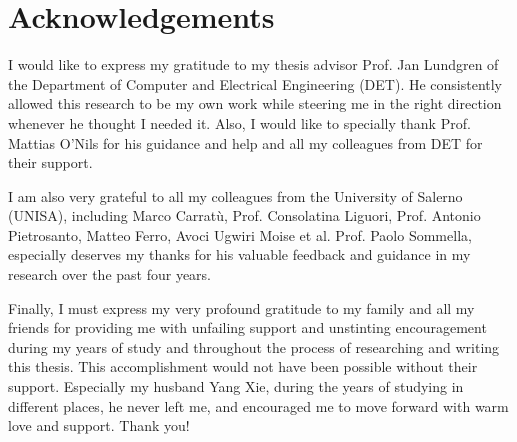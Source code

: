 \thispagestyle{plain}

\chapter*{Acknowledgements} 

I would like to express my gratitude to my thesis advisor Prof. Jan Lundgren of the Department of Computer and Electrical Engineering (DET). He consistently allowed this research to be my own work while steering me in the right direction whenever he thought I needed it. Also, I would like to specially thank Prof. Mattias O’Nils for his guidance and help and all my colleagues from DET for their support.

I am also very grateful to all my colleagues from the University of Salerno (UNISA), including Marco Carratù, Prof. Consolatina Liguori, Prof. Antonio Pietrosanto, Matteo Ferro, Avoci Ugwiri Moise et al. Prof. Paolo Sommella, especially deserves my thanks for his valuable feedback and guidance in my research over the past four years.


Finally, I must express my very profound gratitude to my family and all my friends for providing me with unfailing support and unstinting encouragement during my years of study and throughout the process of researching and writing this thesis. This accomplishment would not have been possible without their support. Especially my husband Yang Xie, during the years of studying in different places, he never left me, and encouraged me to move forward with warm love and support. Thank you!

\vspace{0.5cm}

